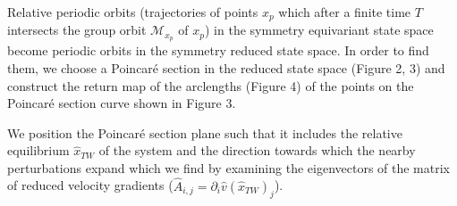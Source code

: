 \color{black}
Relative periodic orbits (trajectories of points $x_p$ which after a finite
time $T$ intersects the group orbit $\mathcal{M}_{x_p}$ of $x_p$) in the 
symmetry equivariant state space become periodic orbits in the symmetry reduced 
state space. In order to find them, we choose a Poincar\'e section in the
reduced state space (Figure 2, 3) and construct the return map of the arclengths
(Figure 4) of the points on the Poincar\'e section curve shown in Figure 3.

We position the Poincar\'e section plane such that it includes the relative
equilibrium $\hat{x}_{TW}$ of the system and the direction towards which the 
nearby perturbations expand which we find by examining the eigenvectors of 
the matrix of reduced velocity gradients ($\hat{A}_{i,j} = \partial_i \hat{v}(\hat{x}_{TW})_j$). 
